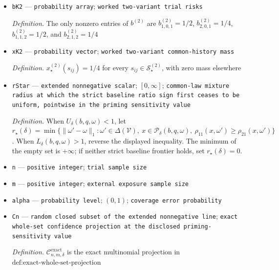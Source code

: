 \documentclass{article}
\begin{document}
\begin{itemize}
  \par\smallskip\noindent\emph{Definition.} \(q^{(2)}_{t0}=0\) and \(q^{(2)}_{t1}=q^{(2)}_{t2}=1/2\) for each \(t\in\mathcal T\)
  \item \texttt{bK2} --- \texttt{probability array}; \texttt{worked two-\allowbreak{}variant trial risks}
  \par\smallskip\noindent\emph{Definition.} The only nonzero entries of \(b^{(2)}\) are \(b^{(2)}_{1,0,1}=1/2\), \(b^{(2)}_{2,0,1}=1/4\), \(b^{(2)}_{1,1,2}=1/2\), and \(b^{(2)}_{2,1,2}=1/4\)
  \item \texttt{xK2} --- \texttt{probability vector}; \texttt{worked two-\allowbreak{}variant common-\allowbreak{}history mass}
  \par\smallskip\noindent\emph{Definition.} \(x_\star^{(2)}(s_{ij})=1/4\) for every \(s_{ij}\in\mathcal S_\star^{(2)}\), with zero mass elsewhere
  \item \texttt{rStar} --- \texttt{extended nonnegative scalar}; \([0,\infty]\); \texttt{common-\allowbreak{}law mixture radius at which the strict baseline ratio sign first ceases to be uniform,\allowbreak{} pointwise in the priming sensitivity value}
  \par\smallskip\noindent\emph{Definition.} When \(U_\delta(b,q,\omega)<1\), let \(r_\star(\delta)=\min\{\lVert\omega'-\omega\rVert_1:\omega'\in\Delta(\mathcal V),\ x\in\mathcal P_\delta(b,q,\omega),\ \rho_{11}(x,\omega')\geq\rho_{21}(x,\omega')\}\). When \(L_\delta(b,q,\omega)>1\), reverse the displayed inequality. The minimum of the empty set is \(+\infty\); if neither strict baseline frontier holds, set \(r_\star(\delta)=0\).
  \item \texttt{n} --- \texttt{positive integer}; \texttt{trial sample size}
  \item \texttt{m} --- \texttt{positive integer}; \texttt{external exposure sample size}
  \item \texttt{alpha} --- \texttt{probability level}; \((0,1)\); \texttt{coverage error probability}
  \item \texttt{Cn} --- \texttt{random closed subset of the extended nonnegative line}; \texttt{exact whole-\allowbreak{}set confidence projection at the disclosed priming-\allowbreak{}sensitivity value}
  \par\smallskip\noindent\emph{Definition.} \(\mathcal C_{n,m,\delta}^{\mathrm{exact}}\) is the exact multinomial projection in \(\text{def:exact-whole-set-projection}\)
\end{itemize}
\end{document}
